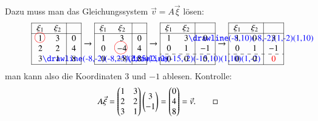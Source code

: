 \begin{beispiel}
Dazu muss man das Gleichungssystem $\vec{v}=A\vec{\xi}$ lösen:
\[
\begin{tabular}{|>{$}c<{$}>{$}c<{$}|>{$}c<{$}|}
\hline
\xi_1&\xi_2&\\
\hline
1%
\begin{picture}(0,0)
\color{red}\put(-3,4){\circle{12}}
\end{picture}%
&3&0\\
2&2&4\\
3%
\begin{picture}(0,0)
\color{blue}\drawline(-8,-2)(-8,25)(2,25)(2,-2)
\end{picture}%
&1&8\\
\hline
\end{tabular}
\rightarrow
\begin{tabular}{|>{$}c<{$}>{$}c<{$}|>{$}c<{$}|}
\hline
\xi_1&\xi_2&\\
\hline
1&3&0\\
0&-4%
\begin{picture}(0,0)
\color{red}\put(-7,4){\circle{15}}
\end{picture}%
&4\\
0&-8%
\begin{picture}(0,0)
\color{blue}\drawline(-15,-2)(-15,10)(1,10)(1,-2)
\end{picture}%
&8\\
\hline
\end{tabular}
\rightarrow
\begin{tabular}{|>{$}c<{$}>{$}c<{$}|>{$}c<{$}|}
\hline
\xi_1&\xi_2&\\
\hline
1&3%
\begin{picture}(0,0)
\color{blue}\drawline(-8,10)(-8,-2)(1,-2)(1,10)
\end{picture}%
&0\\
0&1&-1\\
\hdashline
0&0&0\\
\hline
\end{tabular}
\rightarrow
\begin{tabular}{|>{$}c<{$}>{$}c<{$}|>{$}c<{$}|}
\hline
\xi_1&\xi_2&\\
\hline
1&0&3\\
0&1&-1\\
\hdashline
0&0&\color{red}0\\
\hline
\end{tabular}
\]
man kann also die Koordinaten $3$ und $-1$ ablesen.
Kontrolle:
\[
A\vec{\xi}
=
\begin{pmatrix}
1&3\\
2&2\\
3&1\end{pmatrix}
\begin{pmatrix}3\\-1\end{pmatrix}
=\begin{pmatrix}
0\\4\\8
\end{pmatrix}
=\vec{v}.
\qedhere
\]
\end{beispiel}

